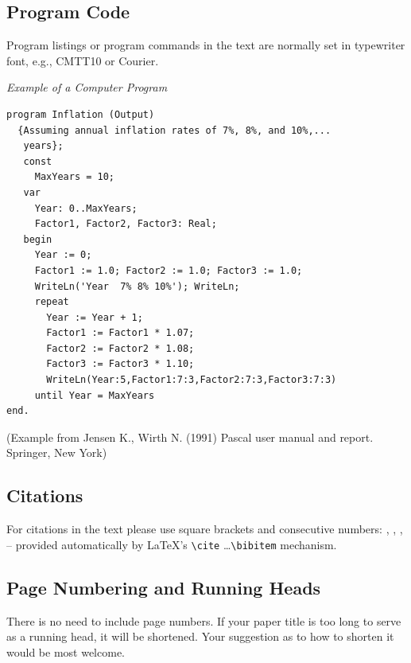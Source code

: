 \documentclass[lnicst,sechang,a4paper]{svmultln}
\begin{document}
\subsection{Program Code}

Program listings or program commands in the text are normally set in
typewriter font, e.g., CMTT10 or Courier.

\medskip

\noindent
{\it Example of a Computer Program}
\begin{verbatim}
program Inflation (Output)
  {Assuming annual inflation rates of 7%, 8%, and 10%,...
   years};
   const
     MaxYears = 10;
   var
     Year: 0..MaxYears;
     Factor1, Factor2, Factor3: Real;
   begin
     Year := 0;
     Factor1 := 1.0; Factor2 := 1.0; Factor3 := 1.0;
     WriteLn('Year  7% 8% 10%'); WriteLn;
     repeat
       Year := Year + 1;
       Factor1 := Factor1 * 1.07;
       Factor2 := Factor2 * 1.08;
       Factor3 := Factor3 * 1.10;
       WriteLn(Year:5,Factor1:7:3,Factor2:7:3,Factor3:7:3)
     until Year = MaxYears
end.
\end{verbatim}
%
\noindent
{\small (Example from Jensen K., Wirth N. (1991) Pascal user manual and
report. Springer, New York)}

\subsection{Citations}

For citations in the text please use
square brackets and consecutive numbers: \cite{jour}, \cite{lnicstchap},
\cite{book}, \cite{proceeding1} -- provided automatically
by \LaTeX 's \verb|\cite| \dots\verb|\bibitem| mechanism.

\subsection{Page Numbering and Running Heads}

There is no need to include page numbers. If your paper title is too
long to serve as a running head, it will be shortened. Your suggestion
as to how to shorten it would be most welcome.
\end{document}

